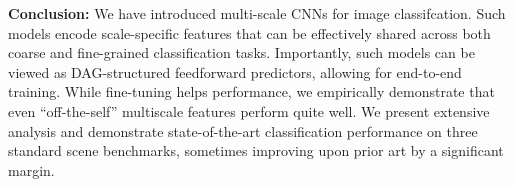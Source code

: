 \documentclass[10pt,twocolumn,letterpaper]{article}
\begin{document}

{\bf Conclusion:} We have introduced multi-scale CNNs for image classifcation. Such models encode scale-specific features that can be effectively shared across both coarse and fine-grained classification tasks. Importantly, such models can be viewed as DAG-structured feedforward predictors, allowing for end-to-end training. While fine-tuning helps performance, we empirically demonstrate that even ``off-the-self'' multiscale features perform quite well. We present extensive analysis and demonstrate state-of-the-art classification performance on three standard scene benchmarks, sometimes improving upon prior art by a significant margin. 
{\small


}
\end{document}
